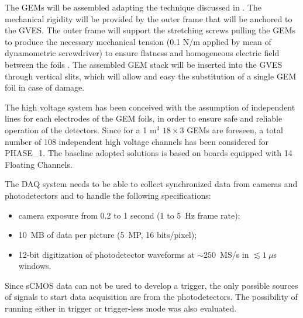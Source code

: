 \documentclass[physics,article,submit,moreauthors,pdftex]{Definitions/mdpi}
\begin{document}
The GEMs will be assembled adapting the technique discussed in \cite{Colaleo:2015vsq}. The mechanical rigidity will be provided by the outer frame that will be anchored to the GVES. The outer frame will support the stretching screws pulling the GEMs to produce the necessary mechanical tension (0.1 N/m applied by mean of dynamometric screwdriver) to ensure flatness and homogeneous electric field between the foils \cite{Benussi:2015omy}. The assembled GEM stack will be inserted into the GVES through vertical slits, which will allow and easy the substitution of a single GEM foil in case of damage.


The high voltage system has been conceived with the assumption of independent lines 
for each electrodes of the GEM foils, in order to ensure safe and reliable 
operation of the detectors. 
Since for a 1 m$^3$ $18 \times 3$ GEMs are foreseen, a total number of 108 independent high voltage channels has been considered for PHASE\_1. The baseline adopted solutions is based on boards equipped with 14 Floating Channels.

The DAQ system needs to be able to collect synchronized data from cameras and photodetectors and to handle the following specifications: 
\begin{itemize}
    \item camera exposure from 0.2 to 1 second (1 to 5~Hz frame rate);
    \item 10~MB of data per picture (5~MP, 16 bits/pixel); 
    \item 12-bit digitization of photodetector waveforms at $\sim 250$~MS/s in $\lesssim 1~\mu$s windows.
\end{itemize}
 Since sCMOS data can not be used to develop a trigger, the only possible sources of signals to start data acquisition are from the photodetectors. The possibility of running either in trigger or trigger-less mode was also evaluated. 
 
\end{document}
